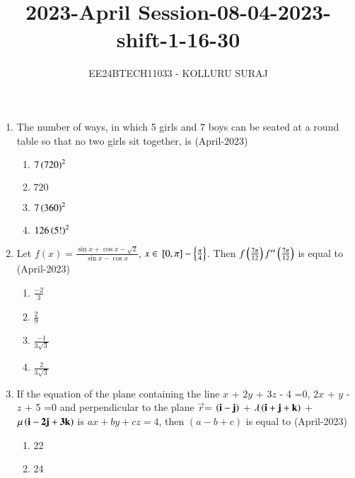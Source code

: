 \documentclass[journal]{IEEEtran}
\numberwithin{equation}{enumi}
\numberwithin{figure}{enumi}
\begin{document}

\title{2023-April Session-08-04-2023-shift-1-16-30}
\author{EE24BTECH11033 - KOLLURU SURAJ}
{\let\newpage\relax\maketitle}
\begin{enumerate}[start=16]
\item The number of ways, in which 5 girls and 7 boys can be seated at a round table so that no two girls sit together, is
\hfill(April-2023)
\begin{multicols}{4}
    \begin{enumerate}
        \item $7\left(720\right)^2$
        \item $720$
        \item $7\left(360\right)^2$
        \item $126\left(5!\right)^2$
    \end{enumerate}
\end{multicols}
\item Let $f(x) = \frac{\sin x + \cos x - \sqrt{2}}{\sin x - \cos x}$, $x \in {}\left[0, \pi\right]-\left\{\frac{\pi}{4}\right\}$. Then $f\left(\frac{7\pi}{12}\right)f^{\prime\prime}\left(\frac{7\pi}{12}\right)$  is equal to
\hfill(April-2023)
\begin{multicols}{4}
    \begin{enumerate}
    \item $\frac{-2}{3}$
    \item $\frac{2}{9}$
    \item $\frac{-1}{3\sqrt3}$
    \item $\frac{2}{3\sqrt{3}}$
    \end{enumerate}
\end{multicols}
\item If the equation of the plane containing the line $x$ + $2y$ + $3z$ - 4 =0, $2x$ + $y$ - $z$ + 5 =0 and perpendicular to the plane $\vec{r}$= $\left(\mathbf{i}-\mathbf{j}\right)$ + $\lambda\left(\mathbf{i}+\mathbf{j}+\mathbf{k}\right)$ +$\mu\left(\mathbf{i}-\mathbf{2j}+\mathbf{3k}\right)$ is $ax + by+cz=4$, then $(a-b+c)$ is equal to
\hfill(April-2023)
\begin{multicols}{4}
    \begin{enumerate}
    \item 22
    \item 24

\end{enumerate}
\end{multicols}
\end{enumerate}
\end{document}
